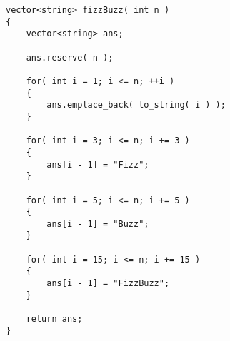 \setcounter{lstlisting}{0}
\begin{lstlisting}[style=customc, caption={Naive Approach}]
vector<string> fizzBuzz( int n )
{
    vector<string> ans;

    ans.reserve( n );

    for( int i = 1; i <= n; ++i )
    {
        ans.emplace_back( to_string( i ) );
    }

    for( int i = 3; i <= n; i += 3 )
    {
        ans[i - 1] = "Fizz";
    }

    for( int i = 5; i <= n; i += 5 )
    {
        ans[i - 1] = "Buzz";
    }

    for( int i = 15; i <= n; i += 15 )
    {
        ans[i - 1] = "FizzBuzz";
    }

    return ans;
}
\end{lstlisting}